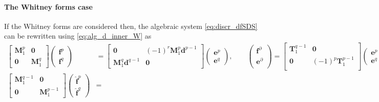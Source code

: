 \documentclass{elsarticle}
\newcommand*{\dual}[1]{\ensuremath{\widehat{#1}}}
\begin{document}
\paragraph{The Whitney forms case}
If the Whitney forms are considered then, the algebraic system \eqref{eq:discr_dfSDS} can be rewritten using \eqref{eq:alg_d_inner_W} as
\begin{equation}\label{eq:discr_dfSDS_W}
\begin{aligned}
    \begin{bmatrix}
        \mathbf{M}^p_1 & \mathbf{0} \\
        \mathbf{0} & \mathbf{M}^q_1
    \end{bmatrix}
    \begin{pmatrix}
    \mathbf{f}^p \\
    \mathbf{f}^q
    \end{pmatrix} &=
    \begin{bmatrix}
        \mathbf{0} & (-1)^r\mathbf{M}^p_1\mathbf{d}^{p-1} \\
        \mathbf{M}^q_1\mathbf{d}^{q-1} & \mathbf{0}
    \end{bmatrix}
    \begin{pmatrix}
    \mathbf{e}^p \\
    \mathbf{e}^q
    \end{pmatrix}, \qquad
    \begin{pmatrix}
    \mathbf{f}^\partial \\
    \mathbf{e}^\partial \\
    \end{pmatrix} = 
    \begin{bmatrix}
    \mathbf{T}^{q-1}_1 & \mathbf{0} \\
    \mathbf{0} & (-1)^p\mathbf{T}^{p-1}_1 \\
    \end{bmatrix}
    \begin{pmatrix}
    \mathbf{e}^p \\
    \mathbf{e}^q
    \end{pmatrix}, \\
    \begin{bmatrix}
        \mathbf{M}^{q-1}_1 & \mathbf{0} \\
        \mathbf{0} & \mathbf{M}^{p-1}_1
    \end{bmatrix}
    \begin{pmatrix}
    \dual{\mathbf{f}}^p \\
    \dual{\mathbf{f}}^q
    \end{pmatrix} &=

\end{aligned}
\end{equation}
\end{document}
